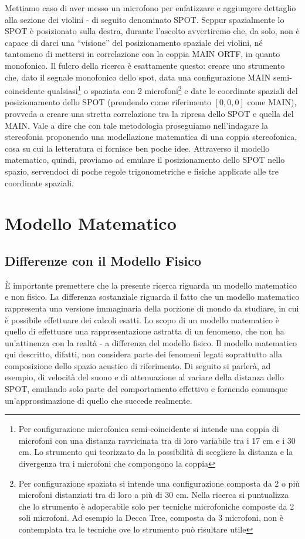 \documentclass{article}
\begin{document}
    Mettiamo caso di aver messo un microfono per enfatizzare e aggiungere dettaglio alla sezione dei violini - di seguito denominato SPOT. Seppur spazialmente lo SPOT è posizionato sulla destra, durante l'ascolto avvertiremo che, da solo, non è capace di darci una ``visione'' del posizionamento spaziale dei violini, né tantomeno di mettersi in correlazione con la coppia MAIN ORTF, in quanto monofonico. Il fulcro della ricerca è esattamente questo: creare uno strumento che, dato il segnale monofonico dello spot, data una configurazione MAIN semi-coincidente qualsiasi\footnote{Per configurazione microfonica semi-coincidente si intende una coppia di microfoni con una distanza ravvicinata tra di loro variabile tra i 17 cm e i 30 cm. Lo strumento qui teorizzato da la possibilità di scegliere la distanza e la divergenza tra i microfoni che compongono la coppia} o spaziata con 2 microfoni\footnote{Per configurazione spaziata si intende una configurazione composta da 2 o più microfoni distanziati tra di loro a più di 30 cm. Nella ricerca si puntualizza che lo strumento è adoperabile solo per tecniche microfoniche composte da 2 soli microfoni. Ad esempio la Decca Tree, composta da 3 microfoni, non è contemplata tra le tecniche ove lo strumento può risultare utile} e date le coordinate spaziali del posizionamento dello SPOT (prendendo come riferimento $[0,0,0]$ come MAIN), provveda a creare una stretta correlazione tra la ripresa dello SPOT e quella del MAIN. Vale a dire che con tale metodologia proseguiamo nell'indagare la stereofonia proponendo una modellazione matematica di una coppia stereofonica, cosa su cui la letteratura ci fornisce ben poche idee. Attraverso il modello matematico, quindi, proviamo ad emulare il posizionamento dello SPOT nello spazio, servendoci di poche regole trigonometriche e fisiche applicate alle tre coordinate spaziali.

\section{Modello Matematico}

    \subsection{Differenze con il Modello Fisico}
    È importante premettere che la presente ricerca riguarda un modello matematico e non fisico. La differenza sostanziale riguarda il fatto che un modello matematico rappresenta una versione immaginaria della porzione di mondo da studiare, in cui è possibile effettuare dei calcoli esatti. Lo scopo di un modello matematico è quello di effettuare una rappresentazione astratta di un fenomeno, che non ha un'attinenza con la realtà - a differenza del modello fisico.     
     Il modello matematico qui descritto, difatti, non considera parte dei fenomeni legati soprattutto alla composizione dello spazio acustico di riferimento. Di seguito si parlerà, ad esempio, di velocità del suono e di attenuazione al variare della distanza dello SPOT, emulando solo parte del comportamento effettivo e fornendo comunque un'approssimazione di quello che succede realmente.
\end{document}
